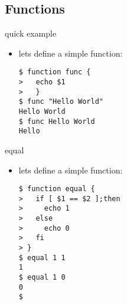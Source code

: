 \documentclass[hyperref={pdfpagelabels=false}]{beamer}
\begin{document}
    \subsection{Functions}
        \begin{frame}[fragile]{quick example}
			\begin{itemize}
                \item<1-> lets define a simple function:
                    \begin{verbatim}
$ function func { 
>   echo $1
>   }
$ func "Hello World"
Hello World
$ func Hello World
Hello
\end{verbatim}
            \end{itemize}
		\end{frame}
        \begin{frame}[fragile]{equal}
			\begin{itemize}
                \item<1-> lets define a simple function:
                    \begin{verbatim}
$ function equal {
>   if [ $1 == $2 ];then
>     echo 1
>   else
>     echo 0
>   fi
> }
$ equal 1 1
1
$ equal 1 0
0
$ 
\end{verbatim}
            \end{itemize}
		\end{frame}
\end{document}
